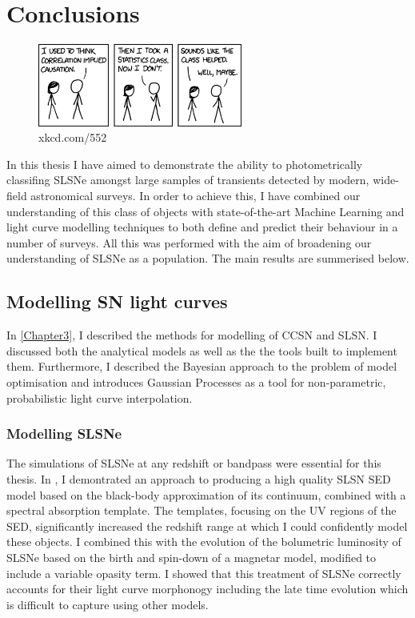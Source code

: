 \chapter{Conclusions}
\label{Chapter7}

\begin{figure}[H]
  \centering
  \includegraphics[width=0.6\textwidth]{Figures/xkcd/chapter7.png}
  \caption*{xkcd.com/552}
\end{figure}

In this thesis I have aimed to demonstrate the ability to photometrically classifing SLSNe amongst large samples of transients detected by modern, wide-field astronomical surveys. In order to achieve this, I have combined our understanding of this class of objects with state-of-the-art Machine Learning and light curve modelling techniques to both define and predict their behaviour in a number of surveys. All this was performed with the aim of broadening our understanding of SLSNe as a population. The main results are summerised below.

\section{Modelling SN light curves}
In \cref{Chapter3}, I described the methods for modelling of CCSN and SLSN. I discussed both the analytical models as well as the the tools built to implement them. Furthermore, I described the Bayesian approach to the problem of model optimisation and introduces Gaussian Processes as a tool for non-parametric, probabilistic light curve interpolation.

\subsection{Modelling SLSNe}
The simulations of SLSNe at any redshift or bandpass were essential for this thesis. In , I demontrated an approach to producing a high quality SLSN SED model based on the black-body approximation of its continuum, combined with a spectral absorption template. The templates, focusing on the UV regions of the SED, significantly increased the redshift range at which I could confidently model these objects. I combined this with the evolution of the bolumetric luminosity of SLSNe based on the birth and spin-down of a magnetar model, modified to include a variable opasity term. I showed that this treatment of SLSNe correctly accounts for their light curve morphonogy including the late time evolution which is difficult to capture using other models.

